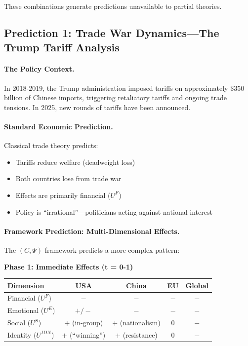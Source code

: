 These combinations generate predictions unavailable to partial theories.

\subsection{Prediction 1: Trade War Dynamics---The Trump Tariff Analysis}

\paragraph{The Policy Context.}
In 2018-2019, the Trump administration imposed tariffs on approximately
\$350 billion of Chinese imports, triggering retaliatory tariffs
and ongoing trade tensions. In 2025, new rounds of tariffs have been announced.

\paragraph{Standard Economic Prediction.}
Classical trade theory predicts:
\begin{itemize}
  \item Tariffs reduce welfare (deadweight loss)
  \item Both countries lose from trade war
  \item Effects are primarily financial ($U^F$)
  \item Policy is ``irrational''---politicians acting against national interest
\end{itemize}

\paragraph{Framework Prediction: Multi-Dimensional Effects.}
The $(C, \Psi)$ framework predicts a more complex pattern:

\textbf{Phase 1: Immediate Effects (t = 0-1)}
\begin{center}
\renewcommand{\arraystretch}{1.2}
\begin{tabular}{lcccc}
\hline
\textbf{Dimension} & \textbf{USA} & \textbf{China} & \textbf{EU} & \textbf{Global} \\
\hline
Financial ($U^F$) & $-$ & $-$ & $-$ & $-$ \\
Emotional ($U^E$) & $+/-$ & $-$ & $-$ & $-$ \\
Social ($U^S$) & $+$ (in-group) & $+$ (nationalism) & $0$ & $-$ \\
Identity ($U^{IDN}$) & $+$ (``winning'') & $+$ (resistance) & $0$ & $-$ \\
\hline
\end{tabular}
\end{center}

